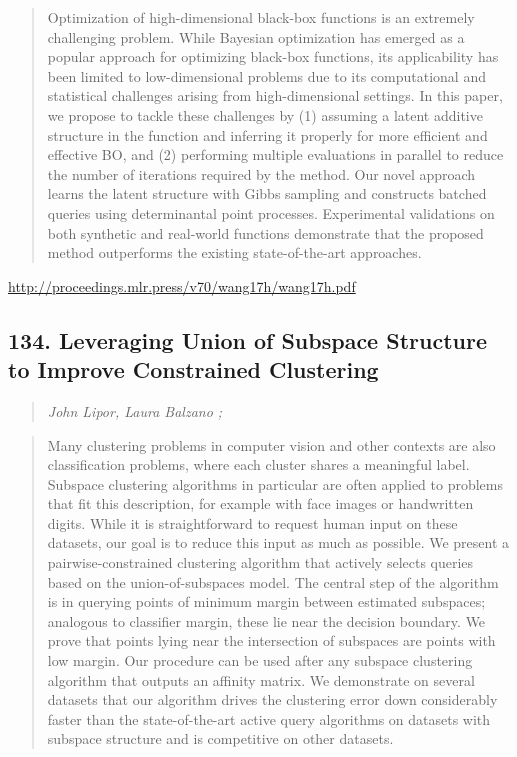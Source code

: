 \documentclass{article}
\begin{document}
\begin{quote}
    Optimization of high-dimensional black-box functions is an extremely challenging problem. While Bayesian optimization has emerged as a popular approach for optimizing black-box functions, its applicability has been limited to low-dimensional problems due to its computational and statistical challenges arising from high-dimensional settings. In this paper, we propose to tackle these challenges by (1) assuming a latent additive structure in the function and inferring it properly for more efficient and effective BO, and (2) performing multiple evaluations in parallel to reduce the number of iterations required by the method. Our novel approach learns the latent structure with Gibbs sampling and constructs batched queries using determinantal point processes. Experimental validations on both synthetic and real-world functions demonstrate that the proposed method outperforms the existing state-of-the-art approaches.  \end{quote}

\href{http://proceedings.mlr.press/v70/wang17h/wang17h.pdf}{http://proceedings.mlr.press/v70/wang17h/wang17h.pdf}

\subsection{134. Leveraging Union of Subspace Structure to Improve Constrained Clustering}

\begin{quote}
\footnotesize{\textit{John Lipor, Laura Balzano ;}}
\end{quote}

\begin{quote}
    Many clustering problems in computer vision and other contexts are also classification problems, where each cluster shares a meaningful label. Subspace clustering algorithms in particular are often applied to problems that fit this description, for example with face images or handwritten digits. While it is straightforward to request human input on these datasets, our goal is to reduce this input as much as possible. We present a pairwise-constrained clustering algorithm that actively selects queries based on the union-of-subspaces model. The central step of the algorithm is in querying points of minimum margin between estimated subspaces; analogous to classifier margin, these lie near the decision boundary. We prove that points lying near the intersection of subspaces are points with low margin. Our procedure can be used after any subspace clustering algorithm that outputs an affinity matrix. We demonstrate on several datasets that our algorithm drives the clustering error down considerably faster than the state-of-the-art active query algorithms on datasets with subspace structure and is competitive on other datasets.  \end{quote}
\end{document}
